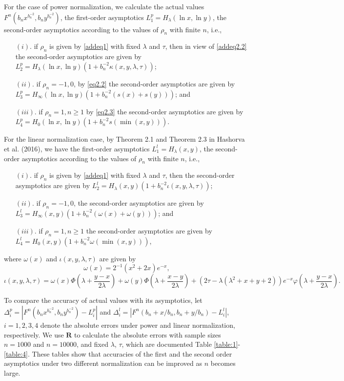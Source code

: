 \documentclass[10pt,twosided]{article}
\numberwithin{equation}{section}
\numberwithin{equation}{section}
\begin{document}
For the case of power normalization, we calculate the
actual values $F^n(b_nx^{b_n^{-2}},b_ny^{b_n^{-2}})$, the first-order
asymptotics $L_1^{p}=H_{\lambda}(\ln x,\ln y)$, the second-order asymptotics according to the values of $\rho_{n}$ with finite $n$, i.e.,
\begin{itemize}
\item[$(i)$.] if $\rho_{n}$ is given by \eqref{addeq1} with
fixed $\lambda$ and $\tau$, then in view of \eqref{addeq2.2}  the
second-order asymptotics are given by
$L_2^{p}=H_{\lambda}(\ln x,\ln y)\left(1+b_n^{-2}\kappa(x,y,\lambda,\tau)\right)$;
\item[ $(ii)$.] if $\rho_{n}=-1,0$, by \eqref{eq2.2} the second-order
 asymptotics are given by
$L_3^{p}=H_{\infty}(\ln x,\ln y)\left(1+b_{n}^{-2}(s(x)+s(y))\right)$; and
\item[$(iii)$.] if $\rho_{n}=1,n\ge 1$ by \eqref{eq2.3}  the second-order
asymptotics are given by
$L_4^{p}=H_{0}(\ln x,\ln y)\left(1+b_{n}^{-2}s(\min(x,y))\right)$.
\end{itemize}

For the linear normalization case, by Theorem 2.1 and Theorem 2.3 in Hashorva et al. (2016), we have
the first-order
asymptotics $L_1^{l}=H_{\lambda}(x, y)$, the second-order asymptotics according to the values of $\rho_{n}$ with finite $n$, i.e.,
\begin{itemize}
\item[$(i)$.] if $\rho_{n}$ is given by \eqref{addeq1} with
fixed $\lambda$ and $\tau$, then the
second-order asymptotics are given by
$L_2^{l}=H_{\lambda}(x,y)(1+b_n^{-2}\iota(x,y,\lambda,\tau))$;
\item[ $(ii)$.] if $\rho_{n}=-1,0$, the second-order
 asymptotics are given by
$L_3^{l}=H_{\infty}(x,y)\left(1+b_{n}^{-2}(\omega(x)+\omega(y))\right)$; and
\item[$(iii)$.] if $\rho_{n}=1,n\ge 1$ the second-order
asymptotics are given by
$L_4^{l}=H_{0}(x,y)\left(1+b_{n}^{-2}\omega(\min(x,y))\right)$,
\end{itemize}
where $\omega(x)$ and $\iota(x,y,\lambda,\tau)$ are given by
$$\omega(x)=2^{-1}(x^2+2x)e^{-x},$$
$$\iota(x,y,\lambda,\tau)=\omega(x)\Phi(\lambda+\frac{y-x}{2\lambda})
+\omega(y)\Phi(\lambda+\frac{x-y}{2\lambda})+
(2\tau-\lambda(\lambda^2+x+y+2))e^{-x}\varphi(\lambda+\frac{y-x}{2\lambda}).$$

To compare the accuracy of actual values with its asymptotics, let $\Delta_i^{p}=|F^n(b_nx^{b_n^{-2}},b_ny^{b_n^{-2}})-L_i^{p}|$ and $\Delta_i^{l}=|F^n(b_n+x/b_n,b_n+y/b_n)-L_i^{l}|$, $i=1,2,3,4$ denote the absolute
errors under power and linear normalization, respectively.
We use $\mathbf{R}$ to calculate the absolute errors with sample sizes $n=1000$ and $n=10000$,
and fixed $\lambda$, $\tau$, which are documented Table \ref{table:1}-\ref{table:4}.
These tables show that accuracies of the first and the second order asymptotics under two different normalization can be improved as $n$ becomes large.
\end{document}
